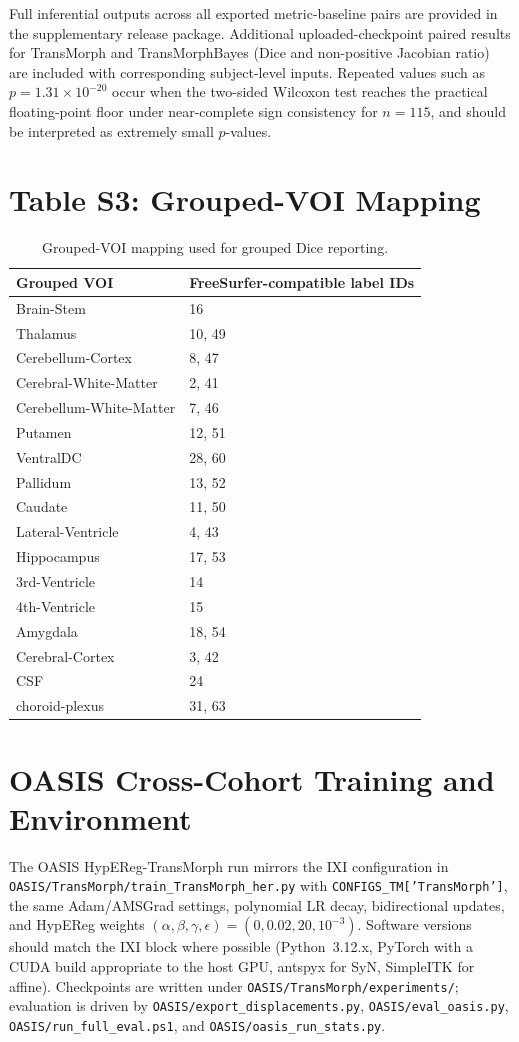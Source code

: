 \documentclass[11pt,a4paper]{article}
\begin{document}
\noindent\footnotesize Full inferential outputs across all exported metric-baseline pairs are provided in the supplementary release package. Additional uploaded-checkpoint paired results for TransMorph and TransMorphBayes (Dice and non-positive Jacobian ratio) are included with corresponding subject-level inputs. Repeated values such as \(p=1.31\times 10^{-20}\) occur when the two-sided Wilcoxon test reaches the practical floating-point floor under near-complete sign consistency for \(n=115\), and should be interpreted as extremely small \(p\)-values.

\section{Table S3: Grouped-VOI Mapping}

\begin{table}[H]
\caption{Grouped-VOI mapping used for grouped Dice reporting.}
\scriptsize
\begin{tabularx}{\textwidth}{lX}
\toprule
\textbf{Grouped VOI} & \textbf{FreeSurfer-compatible label IDs} \\
\midrule
Brain-Stem & 16 \\
Thalamus & 10, 49 \\
Cerebellum-Cortex & 8, 47 \\
Cerebral-White-Matter & 2, 41 \\
Cerebellum-White-Matter & 7, 46 \\
Putamen & 12, 51 \\
VentralDC & 28, 60 \\
Pallidum & 13, 52 \\
Caudate & 11, 50 \\
Lateral-Ventricle & 4, 43 \\
Hippocampus & 17, 53 \\
3rd-Ventricle & 14 \\
4th-Ventricle & 15 \\
Amygdala & 18, 54 \\
Cerebral-Cortex & 3, 42 \\
CSF & 24 \\
choroid-plexus & 31, 63 \\
\bottomrule
\end{tabularx}
\end{table}

\section{OASIS Cross-Cohort Training and Environment}
The OASIS HypEReg-TransMorph run mirrors the IXI configuration in \texttt{OASIS/TransMorph/train\_TransMorph\_her.py} with \texttt{CONFIGS\_TM['TransMorph']}, the same Adam/AMSGrad settings, polynomial LR decay, bidirectional updates, and HypEReg weights $(\alpha,\beta,\gamma,\epsilon)=(0,0.02,20,10^{-3})$. Software versions should match the IXI block where possible (Python~3.12.x, PyTorch with a CUDA build appropriate to the host GPU, antspyx for SyN, SimpleITK for affine). Checkpoints are written under \texttt{OASIS/TransMorph/experiments/}; evaluation is driven by \texttt{OASIS/export\_displacements.py}, \texttt{OASIS/eval\_oasis.py}, \texttt{OASIS/run\_full\_eval.ps1}, and \texttt{OASIS/oasis\_run\_stats.py}.
\end{document}
